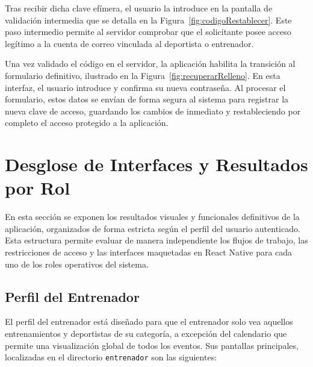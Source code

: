 Tras recibir dicha clave efímera, el usuario la introduce en la pantalla de validación intermedia que se detalla en la Figura~\ref{fig:codigoRestablecer}. Este paso intermedio permite al servidor comprobar que el solicitante posee acceso legítimo a la cuenta de correo vinculada al deportista o entrenador.

Una vez validado el código en el servidor, la aplicación habilita la transición al formulario definitivo, ilustrado en la Figura~\ref{fig:recuperarRelleno}. En esta interfaz, el usuario introduce y confirma su nueva contraseña. Al procesar el formulario, estos datos se envían de forma segura al sistema para registrar la nueva clave de acceso, guardando los cambios de inmediato y restableciendo por completo el acceso protegido a la aplicación.

\section{Desglose de Interfaces y Resultados por Rol}
\label{sec:interfaces_roles}

En esta sección se exponen los resultados visuales y funcionales definitivos de la aplicación, organizados de forma estricta según el perfil del usuario autenticado. Esta estructura permite evaluar de manera independiente los flujos de trabajo, las restricciones de acceso y las interfaces maquetadas en React Native para cada uno de los roles operativos del sistema.

\subsection{Perfil del Entrenador}
\label{subsec:rol_entrenador}
El perfil del entrenador está diseñado para que el entrenador solo vea aquellos entrenamientos y deportistas de su categoría, a excepción del calendario que permite una visualización global de todos los eventos. Sus pantallas principales, localizadas en el directorio \texttt{entrenador} son las siguientes:

